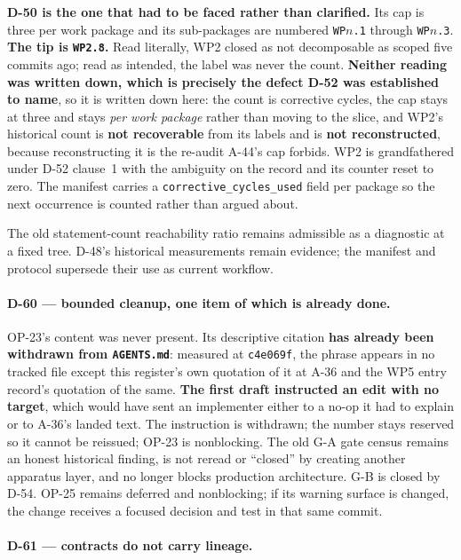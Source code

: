 \documentclass[
  10pt,
]{article}
\begin{document}
\textbf{D-50 is the one that had to be faced rather than clarified.} Its cap is
three per work package and its sub-packages are numbered \texttt{WP$n$.1}
through \texttt{WP$n$.3}. \textbf{The tip is \texttt{WP2.8}.} Read literally,
WP2 closed as not decomposable as scoped five commits ago; read as intended, the
label was never the count. \textbf{Neither reading was written down, which is
precisely the defect D-52 was established to name}, so it is written down here:
the count is corrective cycles, the cap stays at three and stays \emph{per work
package} rather than moving to the slice, and WP2's historical count is
\textbf{not recoverable} from its labels and is \textbf{not reconstructed},
because reconstructing it is the re-audit A-44's cap forbids. WP2 is
grandfathered under D-52 clause~1 with the ambiguity on the record and its
counter reset to zero. The manifest carries a
\texttt{corrective\_cycles\_used} field per package so the next occurrence is
counted rather than argued about.

The old statement-count reachability ratio remains admissible as a diagnostic
at a fixed tree. D-48's historical measurements remain evidence; the manifest
and protocol supersede their use as current workflow.

\paragraph{D-60 --- bounded cleanup, one item of which is already done.}

OP-23's content was never present. Its descriptive citation \textbf{has already
been withdrawn from \texttt{AGENTS.md}}: measured at \texttt{c4e069f}, the
phrase appears in no tracked file except this register's own quotation of it at
A-36 and the WP5 entry record's quotation of the same. \textbf{The first draft
instructed an edit with no target}, which would have sent an implementer either
to a no-op it had to explain or to A-36's landed text. The instruction is
withdrawn; the number stays reserved so it cannot be reissued; OP-23 is
nonblocking. The old G-A gate census remains an honest historical finding, is
not reread or ``closed'' by creating another apparatus layer, and no longer
blocks production architecture. G-B is closed by D-54. OP-25 remains deferred
and nonblocking; if its warning surface is changed, the change receives a
focused decision and test in that same commit.

\paragraph{D-61 --- contracts do not carry lineage.}
\end{document}
